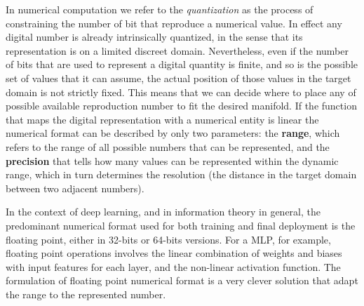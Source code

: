 In numerical computation we refer to the \textit{quantization} as the process of constraining the number of bit that reproduce a numerical value. In effect any digital number is already intrinsically quantized, in the sense that its representation is on a limited discreet domain. Nevertheless, even if the number of bits that are used to represent a digital quantity is finite, and so is the possible set of values that it can assume, the actual position of those values in the target domain is not strictly fixed. This means that we can decide where to place any of possible available reproduction number to fit the desired manifold.
If the function that maps the digital representation with a numerical entity is linear the numerical format can be described by only two parameters: the \textbf{range}, which refers to the range of all possible numbers that can be represented, and the \textbf{precision} that tells how many values can be represented within the dynamic range, which in turn determines the resolution (the distance in the target domain between two adjacent numbers).

In the context of deep learning, and in information theory in general, the predominant numerical format used for both training and final deployment is the floating point, either in 32-bits or 64-bits versions. For a \acs{MLP}, for example, floating point operations involves the linear combination of weights and biases with input features for each layer, and the non-linear activation function. The formulation of floating point numerical format is a very clever solution that adapt the range to the represented number.

